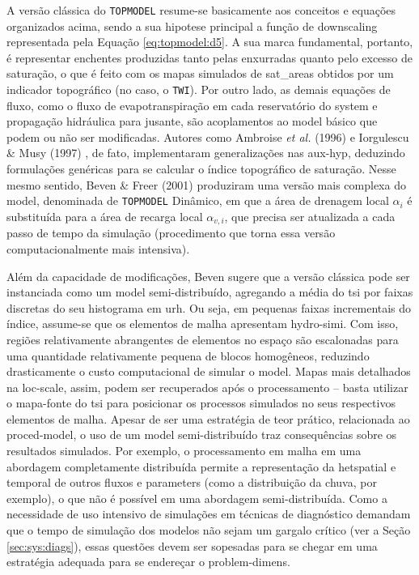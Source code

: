 \documentclass[./main.tex]{subfiles}
\begin{document}
\par A versão clássica do \texttt{TOPMODEL} resume-se basicamente aos conceitos e equações organizados acima, sendo a sua \gls{hipotese} principal a função de \gls{downscaling} representada pela Equação \eqref{eq:topmodel:d5}. A sua marca fundamental, portanto, é representar enchentes produzidas tanto pelas enxurradas quanto pelo excesso de saturação, o que é feito com os mapas simulados de \gls{sat_areas} obtidos por um indicador topográfico (no caso, o \texttt{TWI}). Por outro lado, as demais equações de fluxo, como o fluxo de evapotranspiração em cada reservatório do \gls{system} e propagação hidráulica para jusante, são acoplamentos ao \gls{model} básico que podem ou não ser modificadas. Autores como Ambroise \textit{et al.} (1996) \cite{Ambroise1996a} e Iorgulescu \& Musy (1997) \cite{Iorgulescu1997a}, de fato, implementaram generalizações nas \gls{aux-hyp}, deduzindo formulações genéricas para se calcular o índice topográfico de saturação. Nesse mesmo sentido, Beven \& Freer (2001) \cite{Beven2001b} produziram uma versão mais complexa do \gls{model}, denominada de \texttt{TOPMODEL} Dinâmico, em que a área de drenagem local $\alpha_i$ é substituída para a área de recarga local  $\alpha_{v, i}$, que precisa ser atualizada a cada passo de tempo da simulação (procedimento que torna essa versão computacionalmente mais intensiva).

\par Além da capacidade de modificações, Beven \cite{Beven2012} sugere que a versão clássica pode ser instanciada como um \gls{model} semi-distribuído, agregando a média do \gls{tsi} por faixas discretas do seu histograma em \gls{urh}. Ou seja, em pequenas faixas incrementais do índice, assume-se que os elementos de malha apresentam \gls{hydro-simi}. Com isso, regiões relativamente abrangentes de elementos no espaço são escalonadas para uma quantidade relativamente pequena de blocos homogêneos, reduzindo drasticamente o custo computacional de simular o \gls{model}. Mapas mais detalhados na \gls{loc-scale}, assim, podem ser recuperados após o processamento -- basta utilizar o mapa-fonte do \gls{tsi} para posicionar os processos simulados no seus respectivos elementos de malha. Apesar de ser uma estratégia de teor prático, relacionada ao \gls{proced-model}, o uso de um \gls{model} semi-distribuído traz consequências sobre os resultados simulados. Por exemplo, o processamento em malha em uma abordagem completamente distribuída permite a representação da \gls{hetspatial} e temporal de outros fluxos e \gls{parameters} (como a distribuição da chuva, por exemplo), o que não é possível em uma abordagem semi-distribuída. Como a necessidade de uso intensivo de simulações em técnicas de diagnóstico demandam que o tempo de simulação dos modelos não sejam um gargalo crítico (ver a Seção \ref{sec:sys:diags}), essas questões devem ser sopesadas para se chegar em uma estratégia adequada para se endereçar o \gls{problem-dimens}.
\end{document}
